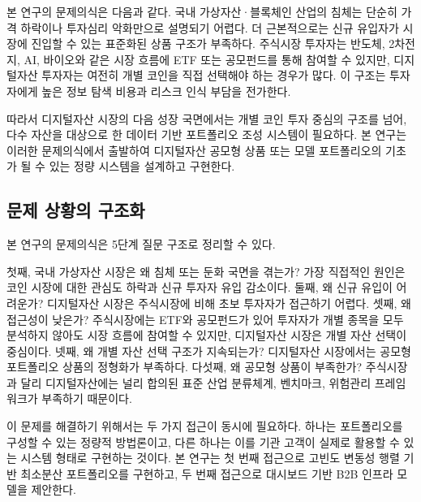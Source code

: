 \documentclass[12pt,a4paper]{article}
\begin{document}
본 연구의 문제의식은 다음과 같다. 국내 가상자산·블록체인 산업의 침체는 단순히 가격 하락이나 투자심리 악화만으로 설명되기 어렵다. 더 근본적으로는 신규 유입자가 시장에 진입할 수 있는 표준화된 상품 구조가 부족하다. 주식시장 투자자는 반도체, 2차전지, AI, 바이오와 같은 시장 흐름에 ETF 또는 공모펀드를 통해 참여할 수 있지만, 디지털자산 투자자는 여전히 개별 코인을 직접 선택해야 하는 경우가 많다. 이 구조는 투자자에게 높은 정보 탐색 비용과 리스크 인식 부담을 전가한다.

따라서 디지털자산 시장의 다음 성장 국면에서는 개별 코인 투자 중심의 구조를 넘어, 다수 자산을 대상으로 한 데이터 기반 포트폴리오 조성 시스템이 필요하다. 본 연구는 이러한 문제의식에서 출발하여 디지털자산 공모형 상품 또는 모델 포트폴리오의 기초가 될 수 있는 정량 시스템을 설계하고 구현한다.


\subsection{문제 상황의 구조화}

본 연구의 문제의식은 5단계 질문 구조로 정리할 수 있다.

첫째, 국내 가상자산 시장은 왜 침체 또는 둔화 국면을 겪는가? 가장 직접적인 원인은 코인 시장에 대한 관심도 하락과 신규 투자자 유입 감소이다. 둘째, 왜 신규 유입이 어려운가? 디지털자산 시장은 주식시장에 비해 초보 투자자가 접근하기 어렵다. 셋째, 왜 접근성이 낮은가? 주식시장에는 ETF와 공모펀드가 있어 투자자가 개별 종목을 모두 분석하지 않아도 시장 흐름에 참여할 수 있지만, 디지털자산 시장은 개별 자산 선택이 중심이다. 넷째, 왜 개별 자산 선택 구조가 지속되는가? 디지털자산 시장에서는 공모형 포트폴리오 상품의 정형화가 부족하다. 다섯째, 왜 공모형 상품이 부족한가? 주식시장과 달리 디지털자산에는 널리 합의된 표준 산업 분류체계, 벤치마크, 위험관리 프레임워크가 부족하기 때문이다.

이 문제를 해결하기 위해서는 두 가지 접근이 동시에 필요하다. 하나는 포트폴리오를 구성할 수 있는 정량적 방법론이고, 다른 하나는 이를 기관 고객이 실제로 활용할 수 있는 시스템 형태로 구현하는 것이다. 본 연구는 첫 번째 접근으로 고빈도 변동성 행렬 기반 최소분산 포트폴리오를 구현하고, 두 번째 접근으로 대시보드 기반 B2B 인프라 모델을 제안한다.

\end{document}
